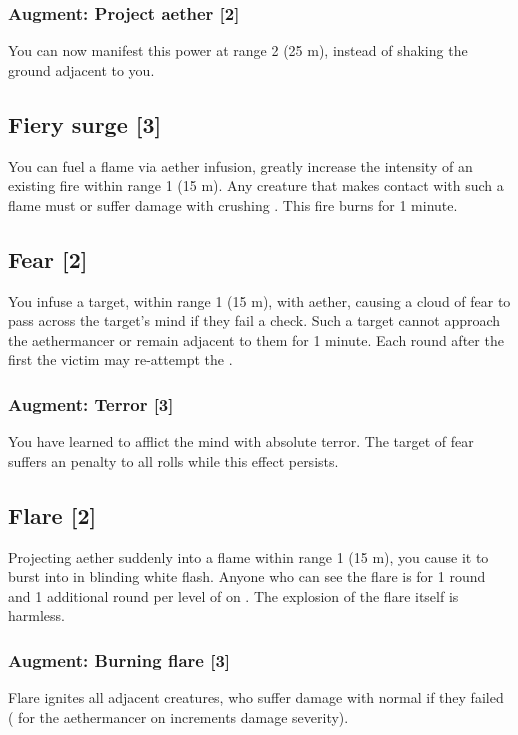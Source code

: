 \subsubsection{Augment: Project aether [2]}
You can now manifest this power at range 2 (25 m), instead of shaking the ground adjacent to you.


\subsection{Fiery surge [3]}
You can fuel a flame via aether infusion, greatly increase the intensity of an existing fire within range 1 (15 m). Any creature that makes contact with such a flame must  or suffer damage with crushing . This fire burns for 1 minute.


\subsection{Fear [2]}
You infuse a target, within range 1 (15 m), with aether, causing a cloud of fear to pass across the target's mind if they fail a  check. Such a target cannot approach the aethermancer or remain adjacent to them for 1 minute. Each round after the first the victim may re-attempt the . 
\subsubsection{Augment: Terror [3]}
You have learned to afflict the mind with absolute terror. The target of fear suffers an  penalty to all rolls while this effect persists. 



\subsection{Flare [2]}
\label{spell:flare}
Projecting aether suddenly into a flame within range 1 (15 m), you cause it to burst into in blinding white flash. Anyone who can see the flare is  for 1 round and 1 additional round per level of  on . The explosion of the flare itself is harmless.
\subsubsection{Augment: Burning flare [3]}
Flare ignites all adjacent creatures, who suffer damage with normal  if they failed  ( for the aethermancer on  increments damage severity).


